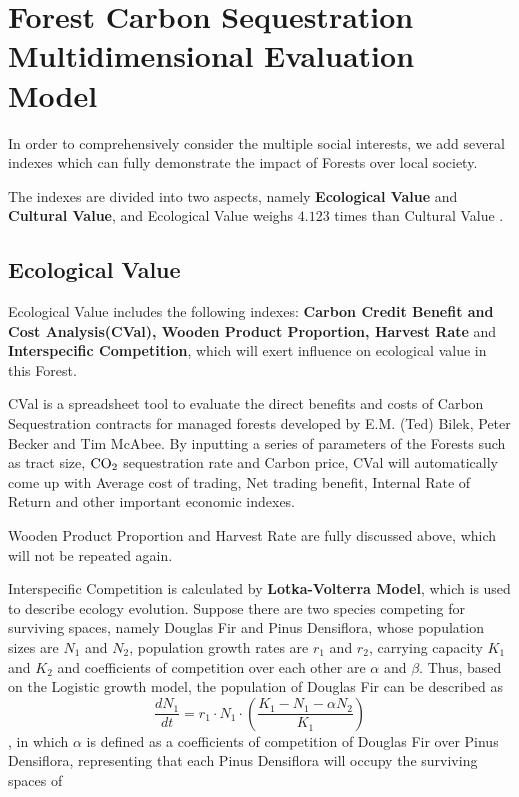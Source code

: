 \documentclass{mcmthesis}
\numberwithin{figure}{section}
\numberwithin{table}{section}
\numberwithin{equation}{section}
\begin{document}
\section{Forest Carbon Sequestration Multidimensional Evaluation Model}


In order to comprehensively consider the multiple social interests, we add
several indexes which can fully demonstrate the impact of Forests over local 
society. 
\par
The indexes are divided into two aspects, namely \textbf{Ecological Value} and \textbf{Cultural Value}, and
Ecological Value weighs $ \bm{4.123} $  times than Cultural Value \citep{2007US}. 

\subsection{Ecological Value}
Ecological Value includes the following indexes: \textbf{Carbon Credit Benefit and 
Cost Analysis(CVal), Wooden Product Proportion, Harvest Rate} and \textbf{Interspecific 
Competition}, which will exert influence on ecological value in this Forest.
\par
CVal is a spreadsheet tool to evaluate the direct benefits and costs of Carbon 
Sequestration contracts for managed forests developed by E.M. (Ted) Bilek,
Peter Becker and Tim McAbee. By inputting a series of parameters of the Forests
such as tract size, $ \rm{CO_2} $ sequestration rate and Carbon price, CVal will
automatically come up with Average cost of trading, Net trading benefit, 
Internal Rate of Return and other important economic indexes. 
\par
Wooden Product Proportion and Harvest Rate are fully discussed above, which will not
be repeated again.
\par
Interspecific Competition is calculated by \textbf{Lotka-Volterra Model}, which is 
used to describe ecology evolution.
Suppose there are two species competing for surviving spaces, namely
Douglas Fir and Pinus Densiflora, whose population sizes are $ N_1 $ and $ N_2 $, population growth rates
are $ r_1 $ and $ r_2 $, carrying capacity $ K_1 $ and $ K_2 $ and coefficients of competition over each other 
are $ \alpha $ and $ \beta $. 
Thus, based on the Logistic growth model, the population of Douglas Fir
can be described as 
$$
  \frac{dN_1}{dt} = r_1\cdot N_1\cdot (\frac{K_1-N_1-\alpha N_2}{K_1})
$$ 
, in which $ \alpha $ is defined as a coefficients of competition of Douglas Fir over Pinus Densiflora,
representing that each Pinus Densiflora will occupy the surviving spaces of
\end{document}
